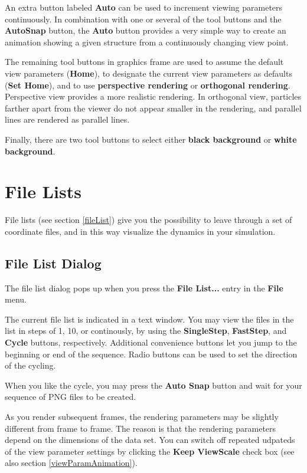 \documentclass[11pt]{article}
\begin{document}
An extra button labeled {\bf Auto} can be used to increment viewing parameters
continuously.  In combination with one or several of the tool buttons and the
{\bf AutoSnap} button, the {\bf Auto} button provides a very simple way to
create an animation showing a given structure from a continuously changing view
point.

The remaining tool buttons in graphics frame are used to assume the default
view parameters ({\bf Home}), to designate the current view parameters as
defaults ({\bf Set Home}), and to use {\bf perspective rendering} or {\bf
orthogonal rendering}.  Perspective view provides a more realistic rendering.
In orthogonal view, particles farther apart from the viewer do not appear
smaller in the rendering, and parallel lines are rendered as parallel lines.   

Finally, there are two tool buttons to select either {\bf black background} 
or {\bf white background}.

\section{File Lists}

File lists (see section \ref{fileList}) give you the possibility to leave
through a set of coordinate files, and in this way visualize the dynamics
in your simulation.  

\subsection{File List Dialog}
\label{fileListDialog}

The file list dialog pops up when you press the {\bf File List...} entry in the
{\bf File} menu.  

The current file list is indicated in a text window.  You may view the files in
the list in steps of 1, 10, or continously, by using the {\bf SingleStep}, {\bf
FastStep}, and {\bf Cycle} buttons, respectively.  Additional convenience
buttons let you jump to the beginning or end of the sequence.  Radio buttons
can be used to set the direction of the cycling.  

When you like the cycle, you may press the {\bf Auto Snap} button and wait for
your sequence of PNG files to be created.

As you render subsequent frames, the rendering parameters may be slightly
different from frame to frame.  The reason is that the rendering parameters
depend on the dimensions of the data set.  You can switch off repeated 
udpateds of the view parameter settings by clicking the {\bf Keep ViewScale} 
check box (see also section \ref{viewParamAnimation}).
\end{document}
